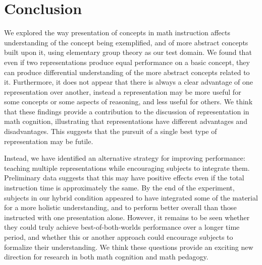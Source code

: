 \documentclass[man,10pt]{apa6}
\begin{document}
\section{Conclusion}
We explored the way presentation of concepts in math instruction affects understanding of the concept being exemplified, and of more abstract concepts built upon it, using elementary group theory as our test domain. We found that even if two representations produce equal performance on a basic concept, they can produce differential understanding of the more abstract concepts related to it. Furthermore, it does not appear that there is always a clear advantage of one representation over another, instead a representation may be more useful for some concepts or some aspects of reasoning, and less useful for others. We think that these findings provide a contribution to the discussion of representation in math cognition, illustrating that representations have different advantages and disadvantages. This suggests that the pursuit of a single best type of representation may be futile. \par
Instead, we have identified an alternative strategy for improving performance: teaching multiple representations while encouraging subjects to integrate them. Preliminary data suggests that this may have positive effects even if the total instruction time is approximately the same. By the end of the experiment, subjects in our hybrid condition appeared to have integrated some of the material for a more holistic understanding, and to perform better overall than those instructed with one presentation alone. However, it remains to be seen whether they could truly achieve best-of-both-worlds performance over a longer time period, and whether this or another approach could encourage subjects to formalize their understanding. We think these questions provide an exciting new direction for research in both math cognition and math pedagogy.  
 




\setcounter{secnumdepth}{-1}
\clearpage
\end{document}
